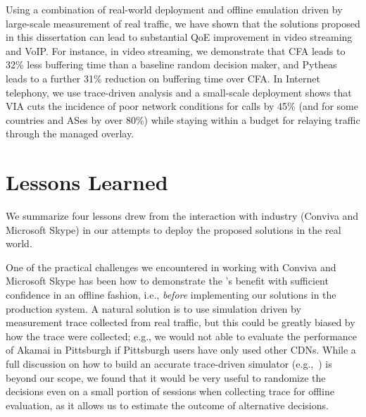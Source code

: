 Using a combination of real-world deployment and offline emulation
driven by large-scale measurement of real traffic, we have shown
that the solutions proposed in this dissertation can lead to substantial 
QoE improvement in video streaming and VoIP. 
For instance, in video streaming, we demonstrate that CFA leads to  
32\% less buffering time than a baseline random decision maker,
and Pytheas leads to a further 31\% reduction on buffering time
over CFA.
In Internet telephony, we use trace-driven analysis
and a small-scale deployment shows that VIA cuts the incidence
of poor network conditions for calls by 45\% (and for
some countries and ASes by over 80\%) while staying within
a budget for relaying traffic through the managed overlay.



\section{Lessons Learned}
\label{sec:concl:lessions}


We summarize four lessons drew from the interaction with industry 
(Conviva and Microsoft Skype) in our attempts to deploy the proposed solutions in 
the real world.

One of the practical challenges we encountered in working with
Conviva and Microsoft Skype has been how to demonstrate the 
\ddn's benefit with sufficient confidence in an  offline fashion, 
i.e., {\em before} implementing our solutions in the production system.
A natural solution is to use simulation driven by measurement
trace collected from real traffic, but this could be greatly 
biased by how
the trace were collected; e.g., we would not able to evaluate
the performance of Akamai in Pittsburgh if Pittsburgh 
users have only used other CDNs. 
While a full discussion on how to build an accurate trace-driven 
simulator (e.g.,~\cite{tariq2008answering}) is beyond our scope, 
we found that it would be very useful to randomize the decisions 
even on a small portion of sessions 
when collecting trace for offline evaluation, as it 
allows us to estimate the outcome of alternative decisions.

